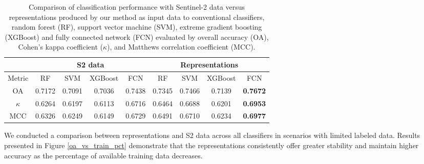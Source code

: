 \documentclass[journal,article,submit,pdftex,moreauthors]{Definitions/mdpi}
\begin{document}

\begin{table}[H]
    \centering
    \caption{Comparison of classification performance with Sentinel-2 data versus representations produced by our method as input data to conventional classifiers, random forest (RF), support vector machine (SVM), extreme gradient boosting (XGBoost) and fully connected network (FCN) evaluated by overall accuracy (OA), Cohen’s kappa coefficient ($\kappa$), and Matthews correlation coefficient (MCC).}
    \begin{tabular}{c|c c c c| c c c c}
    \hline 
        & \multicolumn{4}{c|}{S2 data} & \multicolumn{4}{c}{Representations}\\ \hline
        Metric &    RF  &   SVM  &   XGBoost &   FCN    &    RF   &   SVM     &   XGBoost &   FCN \\ \hline
         OA   & 0.7172 & 0.7091 &   0.7036  &  0.7438  &  0.7345 &   0.7466  &   0.7139  & \textbf{0.7672}\\ 
         $\kappa$    & 0.6264 & 0.6197 &   0.6113  &  0.6716  &  0.6464 &   0.6688  &   0.6201  & \textbf{0.6953}\\ 
         MCC   & 0.6326 & 0.6249 &   0.6149  &  0.6729  &  0.6491 &   0.6710  &   0.6234  & \textbf{0.6977} \\ \hline
    \end{tabular}
    \label{Classification_performance_evaluation_conventional_classifiers}
\end{table}

We conducted a comparison between representations and S2 data across all classifiers in scenarios with limited labeled data. Results presented in Figure \ref{oa_vs_train_pct} demonstrate that the representations consistently offer greater stability and maintain higher accuracy as the percentage of available training data decreases.
\end{document}

